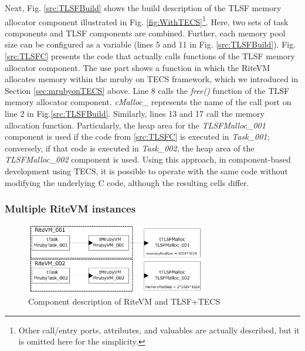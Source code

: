 \documentclass[JIP]{ipsj_v2/UTF8/ipsj}
\begin{document}
Next, Fig. \ref{src:TLSFBuild} shows the build description of the TLSF memory allocator component illustrated in Fig. \ref{fig:WithTECS}\footnote{Other call/entry ports, attributes, and valuables are actually described, but it is omitted here for the simplicity.}.
Here, two sets of task components and TLSF components are combined.
Further, each memory pool size can be configured as a variable (lines 5 and 11 in Fig. \ref{src:TLSFBuild}).
Fig. \ref{src:TLSFC} presents the code that actually calls functions of the TLSF memory allocator component.
The use part shows a function in which the RiteVM allocates memory within the mruby on TECS framework\cite{par:mrubyonTECS}\cite{par:mrubyonTECS3}, which we introduced in Section \ref{sec:mrubyonTECS} above.
Line 8 calls the {\it free()} function of the TLSF memory allocator component.
{\it cMalloc\_} represents the name of the call port on line 2 in Fig.\ref{src:TLSFBuild}.
Similarly, lines 13 and 17 call the memory allocation function.
Particularly, the heap area for the {\it TLSFMalloc\_001} component is used if the code from \ref{src:TLSFC} is executed in {\it Task\_001}; conversely, if that code is executed in {\it Task\_002}, the heap area of the {\it TLSFMalloc\_002} component is used.
Using this approach, in component-based development using TECS, it is possible to operate with the same code without modifying the underlying C code, although the resulting cells differ.

\subsubsection*{Multiple RiteVM instances}

\begin{figure}[t]
    \centering
    \includegraphics[width=8cm,clip]{figure/UseCase_mruby.pdf}
    \caption{Component description of RiteVM and TLSF+TECS}
    \label{fig:UseCase_mruby}
\end{figure}
\end{document}
